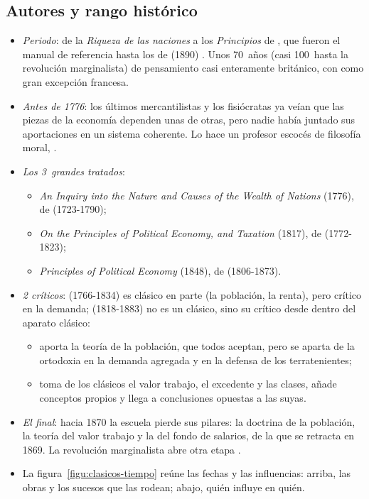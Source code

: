 \documentclass[11pt]{article}
\begin{document}
\subsection{Autores y rango histórico}\label{sec:autores}

\begin{itemize}
\item \emph{Periodo}: de la \emph{Riqueza de las naciones}\nocite{Smith1776Wealth} a los \emph{Principios} de \textcite{Mill1848Principles}, que fueron el manual de referencia hasta los de  (1890) . Unos 70~años (casi 100~hasta la revolución marginalista) de pensamiento casi enteramente británico, con  como gran excepción francesa.
\item \emph{Antes de 1776}: los últimos mercantilistas y los fisiócratas ya veían que las piezas de la economía dependen unas de otras, pero nadie había juntado sus aportaciones en un sistema coherente. Lo hace un profesor escocés de filosofía moral, .
\item \emph{Los 3~grandes tratados}:
  \begin{itemize}
  \item \emph{An Inquiry into the Nature and Causes of the Wealth of Nations} (1776), de  (1723-1790)\nocite{Smith1776Wealth};
  \item \emph{On the Principles of Political Economy, and Taxation} (1817), de  (1772-1823)\nocite{Ricardo1817Principles};
  \item \emph{Principles of Political Economy} (1848), de  (1806-1873)\nocite{Mill1848Principles}.
  \end{itemize}
\item \emph{2 críticos}:  (1766-1834) es clásico en parte (la población, la renta), pero crítico en la demanda;  (1818-1883) no es un clásico, sino su crítico desde dentro del aparato clásico:
  \begin{itemize}
  \item {} aporta la teoría de la población, que todos aceptan, pero se aparta de la ortodoxia en la demanda agregada y en la defensa de los terratenientes;
  \item {} toma de los clásicos el valor trabajo, el excedente y las clases, añade conceptos propios y llega a conclusiones opuestas a las suyas.
  \end{itemize}
\item \emph{El final}: hacia 1870 la escuela pierde sus pilares: la doctrina de la población, la teoría del valor trabajo y la del fondo de salarios, de la que  se retracta en 1869\nocite{Mill1869Thornton}. La revolución marginalista\nocite{Jevons1871Theory} abre otra etapa .
\item La figura~\ref{figu:clasicos-tiempo} reúne las fechas y las influencias: arriba, las obras y los sucesos que las rodean; abajo, quién influye en quién.
\end{itemize}
\end{document}
